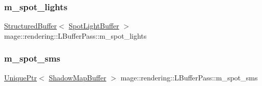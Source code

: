 \subsubsection{\texorpdfstring{m\+\_\+spot\+\_\+lights}{m\_spot\_lights}}
{\footnotesize\ttfamily \mbox{\hyperlink{classmage_1_1rendering_1_1_structured_buffer}{Structured\+Buffer}}$<$ \mbox{\hyperlink{structmage_1_1rendering_1_1_spot_light_buffer}{Spot\+Light\+Buffer}} $>$ mage\+::rendering\+::\+L\+Buffer\+Pass\+::m\+\_\+spot\+\_\+lights\hspace{0.3cm}{\ttfamily [private]}}

\mbox{\label{classmage_1_1rendering_1_1_l_buffer_pass_ae3030c5dea15584fd575679c68c6adc8}} 
\subsubsection{\texorpdfstring{m\+\_\+spot\+\_\+sms}{m\_spot\_sms}}
{\footnotesize\ttfamily \mbox{\hyperlink{namespacemage_a3316d7143a973e37adf1110f2e80ca31}{Unique\+Ptr}}$<$ \mbox{\hyperlink{classmage_1_1rendering_1_1_shadow_map_buffer}{Shadow\+Map\+Buffer}} $>$ mage\+::rendering\+::\+L\+Buffer\+Pass\+::m\+\_\+spot\+\_\+sms\hspace{0.3cm}{\ttfamily [private]}}

